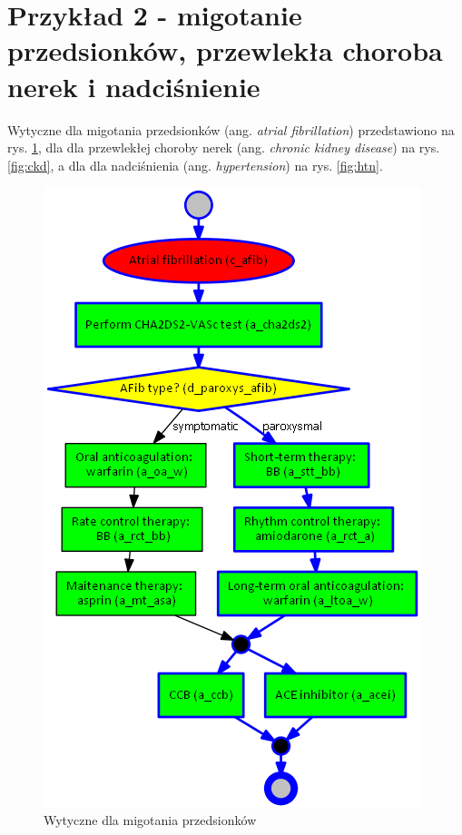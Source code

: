 \section{Przykład 2 - migotanie przedsionków, przewlekła choroba nerek i nadciśnienie}
Wytyczne dla migotania przedsionków (ang. \textit{atrial fibrillation}) przedstawiono na rys. \ref{fig:afib}, dla dla przewlekłej choroby nerek (ang. \textit{chronic kidney disease}) na rys. \ref{fig:ckd}, a dla dla nadciśnienia (ang. \textit{hypertension}) na rys. \ref{fig:htn}.

\begin{figure}[H]
\centering
\includegraphics[scale=0.45]{img/afib-ver-4.png}
\caption{Wytyczne dla migotania przedsionków}
\label{fig:afib}
\end{figure}


